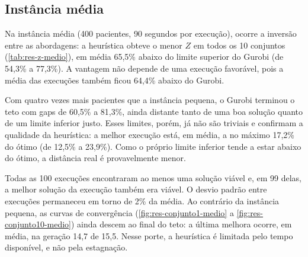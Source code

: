 \subsection{Instância média}
\label{sec:res-media}

Na instância média (400 pacientes, 90 segundos por execução), ocorre a inversão entre as abordagens: a heurística obteve o menor $Z$ em todos os 10 conjuntos (\autoref{tab:res-z-medio}), em média 65,5\% abaixo do limite superior do Gurobi (de 54,3\% a 77,3\%). A vantagem não depende de uma execução favorável, pois a média das execuções também ficou 64,4\% abaixo do Gurobi.

Com quatro vezes mais pacientes que a instância pequena, o Gurobi terminou o teto com gaps de 60,5\% a 81,3\%, ainda distante tanto de uma boa solução quanto de um limite inferior justo. Esses limites, porém, já não são triviais e confirmam a qualidade da heurística: a melhor execução está, em média, a no máximo 17,2\% do ótimo (de 12,5\% a 23,9\%). Como o próprio limite inferior tende a estar abaixo do ótimo, a distância real é provavelmente menor.

Todas as 100 execuções encontraram ao menos uma solução viável e, em 99 delas, a melhor solução da execução também era viável. O desvio padrão entre execuções permaneceu em torno de 2\% da média. Ao contrário da instância pequena, as curvas de convergência (\autoref{fig:res-conjunto1-medio} a \autoref{fig:res-conjunto10-medio}) ainda descem ao final do teto: a última melhora ocorre, em média, na geração 14,7 de 15,5. Nesse porte, a heurística é limitada pelo tempo disponível, e não pela estagnação.

